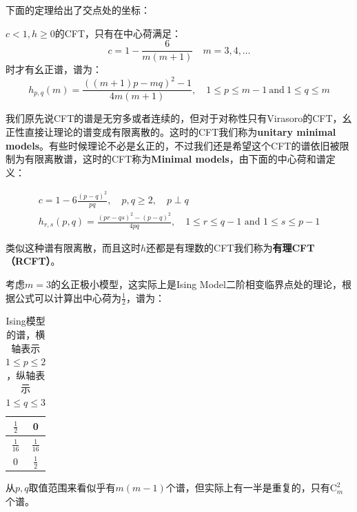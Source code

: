 下面的定理给出了交点处的坐标：
\begin{theorem}
	$c<1,h\geq 0$的CFT，只有在中心荷满足：
	\begin{equation}
	\boxed{
			c=1-\frac6{m(m+1)}\quad m=3,4,\ldots
	}
	\end{equation}
	时才有幺正谱，谱为：
	\begin{equation}
		\boxed{
			h_{p,q}(m)=\frac{\left(\left(m+1\right)p-mq\right)^2-1}{4m\left(m+1\right)},\quad 1\leq p\leq m-1\mathrm{~and~}1\leq q\leq m
		}
	\end{equation}
\end{theorem}
我们原先说CFT的谱是无穷多或者连续的，但对于对称性只有Virasoro的CFT，幺正性直接让理论的谱变成有限离散的。这时的CFT我们称为\textbf{unitary minimal models}。有些时候理论不必是幺正的，不过我们还是希望这个CFT的谱依旧被限制为有限离散谱，这时的CFT称为\textbf{Minimal models}，由下面的中心荷和谱定义：
\begin{theorem}
	\begin{equation}
		\boxed{
			\begin{gathered}
				c=1-6\frac{(p-q)^2}{pq},\quad p,q\geq2,\quad p\perp q\\
			h_{r,s}(p,q)=\frac{(pr-qs)^2-(p-q)^2}{4pq},\quad 1\leq r\leq q-1\text{ and }1\leq s\leq p-1
			\end{gathered}
		}
	\end{equation}
\end{theorem}
类似这种谱有限离散，而且这时$h$还都是有理数的CFT我们称为\textbf{有理CFT（RCFT）}。
\begin{example}
	考虑$m=3$的幺正极小模型，这实际上是Ising Model二阶相变临界点处的理论，根据公式可以计算出中心荷为$\frac{1}{2}$，谱为：
	\begin{table}[H]
		\centering
		\renewcommand{\arraystretch}{1.5}
			\begin{tabular}{|c|c|}
				\hline
				$\frac{1}{2}$  & 0              \\ \hline
				$\frac{1}{16}$ & $\frac{1}{16}$ \\ \hline
				0              & $\frac{1}{2}$  \\ \hline
			\end{tabular}
		\caption{Ising模型的谱，横轴表示$1\leq p\leq 2$，纵轴表示$1\leq q\leq 3$}
	\end{table}
	从$p,q$取值范围来看似乎有$m(m-1)$个谱，但实际上有一半是重复的，只有$\mathrm{C}^2_m$个谱。
\end{example}

